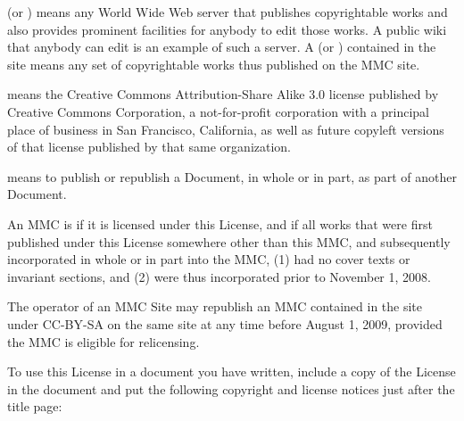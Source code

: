  (or ) means any
World Wide Web server that publishes copyrightable works and also
provides prominent facilities for anybody to edit those works.  A
public wiki that anybody can edit is an example of such a server.  A
 (or ) contained in the
site means any set of copyrightable works thus published on the MMC
site.

 means the Creative Commons Attribution-Share Alike 3.0
license published by Creative Commons Corporation, a not-for-profit
corporation with a principal place of business in San Francisco,
California, as well as future copyleft versions of that license
published by that same organization.

 means to publish or republish a Document, in whole or
in part, as part of another Document.

An MMC is  if it is licensed under this
License, and if all works that were first published under this License
somewhere other than this MMC, and subsequently incorporated in whole
or in part into the MMC, (1) had no cover texts or invariant sections,
and (2) were thus incorporated prior to November 1, 2008.

The operator of an MMC Site may republish an MMC contained in the site
under CC-BY-SA on the same site at any time before August 1, 2009,
provided the MMC is eligible for relicensing.


\stopalignment

To use this License in a document you have written, include a copy of
the License in the document and put the following copyright and
license notices just after the title page:

\bigskip
{}
\bigskip

